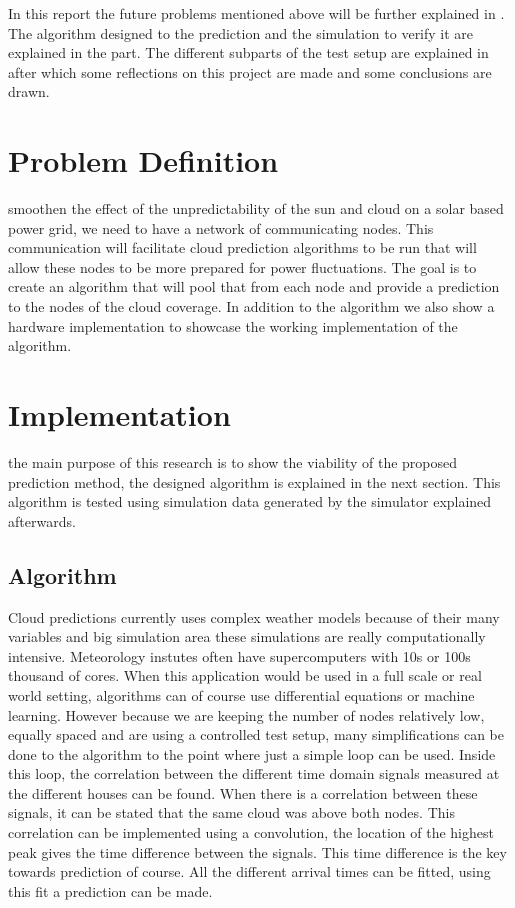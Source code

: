 \documentclass[a4paper,journal]{DDREAM}
\begin{document}
In this report the future problems mentioned above will be further explained in .
The algorithm designed to the prediction and the simulation to verify it are explained in the  part.
The different subparts of the test setup are explained in  after which some reflections on this project are made and some conclusions are drawn.

\section{Problem Definition}\label{sec:problem_definition}
 smoothen the effect of the unpredictability of the sun and cloud on a solar based power grid, we need to have a network of communicating nodes. This communication will facilitate cloud prediction algorithms to be run that will allow these nodes to be more prepared for power fluctuations. The goal is to create an algorithm that will pool that from each node and provide a prediction to the nodes of the cloud coverage. In addition to the algorithm we also show a hardware implementation to showcase the working implementation of the algorithm.

\section{Implementation}\label{sec:implementation}
 the main purpose of this research is to show the viability of the proposed prediction method, the designed algorithm is explained in the next section.
This algorithm is tested using simulation data generated by the simulator explained afterwards.

\clearpage

\subsection{Algorithm}\label{sec:implementation-algorithm}
Cloud predictions currently uses complex weather models because of their many variables and big simulation area these simulations are really computationally intensive.
Meteorology instutes often have supercomputers with 10s or 100s thousand of cores.
When this application would be used in a full scale or real world setting, algorithms can of course use differential equations or machine learning.
However because we are keeping the number of nodes relatively low, equally spaced and are using a controlled test setup, many simplifications can be done to the algorithm to the point where just a simple loop can be used.
Inside this loop, the correlation between the different time domain signals measured at the different houses can be found.
When there is a correlation between these signals, it can be stated that the same cloud was above both nodes.
This correlation can be implemented using a convolution, the location of the highest peak gives the time difference between the signals.
This time difference is the key towards prediction of course.
All the different arrival times can be fitted, using this fit a prediction can be made.
\end{document}
